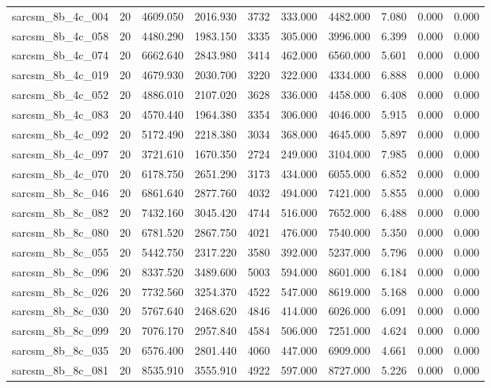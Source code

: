 \begin{tabular}{lrrrrrrrrr}
sarcsm\_8b\_4c\_004 & 20 & 4609.050 & 2016.930 & 3732 & 333.000 & 4482.000 & 7.080 & 0.000 & 0.000 \\
sarcsm\_8b\_4c\_058 & 20 & 4480.290 & 1983.150 & 3335 & 305.000 & 3996.000 & 6.399 & 0.000 & 0.000 \\
sarcsm\_8b\_4c\_074 & 20 & 6662.640 & 2843.980 & 3414 & 462.000 & 6560.000 & 5.601 & 0.000 & 0.000 \\
sarcsm\_8b\_4c\_019 & 20 & 4679.930 & 2030.700 & 3220 & 322.000 & 4334.000 & 6.888 & 0.000 & 0.000 \\
sarcsm\_8b\_4c\_052 & 20 & 4886.010 & 2107.020 & 3628 & 336.000 & 4458.000 & 6.408 & 0.000 & 0.000 \\
sarcsm\_8b\_4c\_083 & 20 & 4570.440 & 1964.380 & 3354 & 306.000 & 4046.000 & 5.915 & 0.000 & 0.000 \\
sarcsm\_8b\_4c\_092 & 20 & 5172.490 & 2218.380 & 3034 & 368.000 & 4645.000 & 5.897 & 0.000 & 0.000 \\
sarcsm\_8b\_4c\_097 & 20 & 3721.610 & 1670.350 & 2724 & 249.000 & 3104.000 & 7.985 & 0.000 & 0.000 \\
sarcsm\_8b\_4c\_070 & 20 & 6178.750 & 2651.290 & 3173 & 434.000 & 6055.000 & 6.852 & 0.000 & 0.000 \\
sarcsm\_8b\_8c\_046 & 20 & 6861.640 & 2877.760 & 4032 & 494.000 & 7421.000 & 5.855 & 0.000 & 0.000 \\
sarcsm\_8b\_8c\_082 & 20 & 7432.160 & 3045.420 & 4744 & 516.000 & 7652.000 & 6.488 & 0.000 & 0.000 \\
sarcsm\_8b\_8c\_080 & 20 & 6781.520 & 2867.750 & 4021 & 476.000 & 7540.000 & 5.350 & 0.000 & 0.000 \\
sarcsm\_8b\_8c\_055 & 20 & 5442.750 & 2317.220 & 3580 & 392.000 & 5237.000 & 5.796 & 0.000 & 0.000 \\
sarcsm\_8b\_8c\_096 & 20 & 8337.520 & 3489.600 & 5003 & 594.000 & 8601.000 & 6.184 & 0.000 & 0.000 \\
sarcsm\_8b\_8c\_026 & 20 & 7732.560 & 3254.370 & 4522 & 547.000 & 8619.000 & 5.168 & 0.000 & 0.000 \\
sarcsm\_8b\_8c\_030 & 20 & 5767.640 & 2468.620 & 4846 & 414.000 & 6026.000 & 6.091 & 0.000 & 0.000 \\
sarcsm\_8b\_8c\_099 & 20 & 7076.170 & 2957.840 & 4584 & 506.000 & 7251.000 & 4.624 & 0.000 & 0.000 \\
sarcsm\_8b\_8c\_035 & 20 & 6576.400 & 2801.440 & 4060 & 447.000 & 6909.000 & 4.661 & 0.000 & 0.000 \\
sarcsm\_8b\_8c\_081 & 20 & 8535.910 & 3555.910 & 4922 & 597.000 & 8727.000 & 5.226 & 0.000 & 0.000 \\

\end{tabular}
